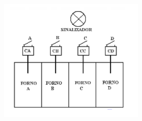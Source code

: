 \documentclass[12pt,onepage,a4paper]{memoir}
\begin{document}
\begin{enumerate}
    \begin{figure}[H]
        \centering
        \includegraphics[scale=0.85]{fig/forno.png}
        \label{fig:forno}
    \end{figure}


    



\setcounter{cont}{\value{enumi}}
\end{enumerate} %



\end{document}
